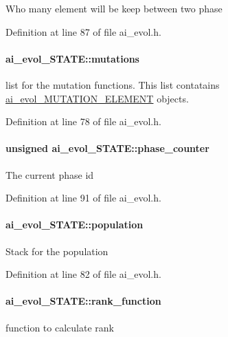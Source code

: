 Who many element will be keep between two phase 

Definition at line 87 of file ai\-\_\-evol.\-h.

\hypertarget{a00003_a1ecc1cb59a98ecb473aaa3f9bece314c}{
\paragraph[{mutations}]{ ai\-\_\-evol\-\_\-\-S\-T\-A\-T\-E\-::mutations}}\label{a00003_a1ecc1cb59a98ecb473aaa3f9bece314c}
list for the mutation functions. This list contatains \hyperlink{a00002}{ai\-\_\-evol\-\_\-\-M\-U\-T\-A\-T\-I\-O\-N\-\_\-\-E\-L\-E\-M\-E\-N\-T} objects. 

Definition at line 78 of file ai\-\_\-evol.\-h.

\hypertarget{a00003_aebb7070e519b1dfc35290d56844f52a7}{
\paragraph[{phase\-\_\-counter}]{\setlength{\rightskip}{0pt plus 5cm}unsigned ai\-\_\-evol\-\_\-\-S\-T\-A\-T\-E\-::phase\-\_\-counter}}\label{a00003_aebb7070e519b1dfc35290d56844f52a7}
The current phase id 

Definition at line 91 of file ai\-\_\-evol.\-h.

\hypertarget{a00003_a729b9f6da125fae3a756808aa6800b12}{
\paragraph[{population}]{ ai\-\_\-evol\-\_\-\-S\-T\-A\-T\-E\-::population}}\label{a00003_a729b9f6da125fae3a756808aa6800b12}
Stack for the population 

Definition at line 82 of file ai\-\_\-evol.\-h.

\hypertarget{a00003_aaa7bfad69e416dc6acb8b7fb1e9689ab}{
\paragraph[{rank\-\_\-function}]{ ai\-\_\-evol\-\_\-\-S\-T\-A\-T\-E\-::rank\-\_\-function}}\label{a00003_aaa7bfad69e416dc6acb8b7fb1e9689ab}
function to calculate rank 

